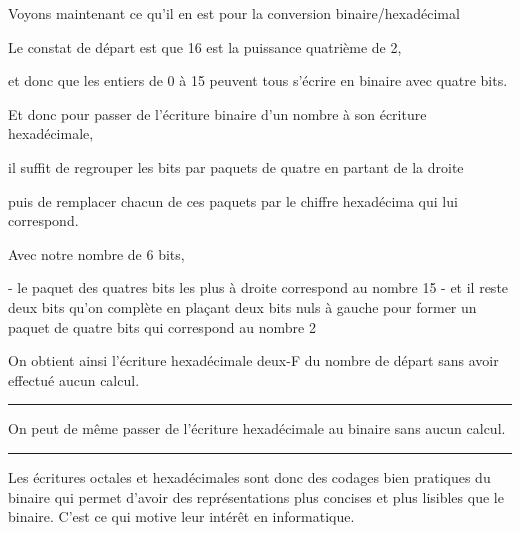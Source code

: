 \diapo %

Voyons maintenant ce qu'il en est pour la conversion binaire/hexadécimal

\change
Le constat de départ est que 16 est la puissance quatrième de 2,

\change
et donc que les entiers de 0 à 15 peuvent tous s'écrire  en binaire avec quatre bits.

\change
Et donc pour passer de l'écriture binaire d'un nombre à son écriture hexadécimale,

\change
il suffit de regrouper les bits par paquets de quatre en partant de la droite

\change
puis de remplacer chacun de ces paquets par le chiffre hexadécima qui lui correspond.

\change

Avec notre nombre de 6 bits, 

- le paquet des quatres bits les plus à droite correspond au nombre 15
- et il reste deux bits qu'on complète en plaçant deux bits nuls à gauche pour former un paquet de quatre bits qui correspond au nombre 2

On obtient ainsi l'écriture hexadécimale deux-F du nombre de départ sans avoir effectué aucun calcul.

\hrule\medskip
On peut de même passer de l'écriture hexadécimale au binaire sans aucun calcul.


\hrule\medskip

Les écritures octales et hexadécimales sont donc des codages bien pratiques du binaire qui permet d'avoir des représentations plus concises et plus lisibles que le binaire. C'est ce qui motive leur intérêt en informatique.







